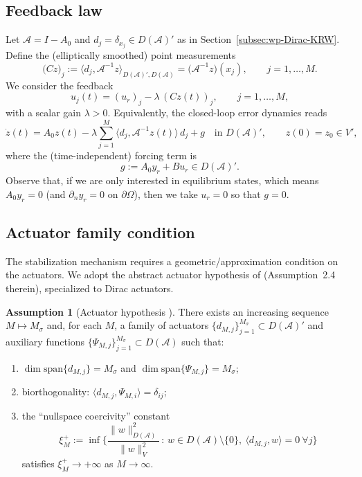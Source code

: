 \documentclass[11pt,a4paper]{article}
\numberwithin{equation}{section}
\theoremstyle{definition}
\newtheorem{assumption}[theorem]{Assumption}
\newcommand{\1}{\mathbbm{1}}
\begin{document}
\subsection{Feedback law}
\noindent
Let $\mathcal A=I-A_0$ and $d_j=\delta_{x_j}\in D(\mathcal A)'$ as in Section~\ref{subsec:wp-Dirac-KRW}.
Define the (elliptically smoothed) point measurements
\[
\big(Cz\big)_j := \langle d_j,\mathcal A^{-1}z\rangle_{D(\mathcal A)',D(\mathcal A)}
= \big(\mathcal A^{-1}z\big)(x_j),\qquad j=1,\dots,M.
\]
We consider the feedback
\begin{equation}
\label{eq:KRW-feedback}
u_j(t) = (u_r)_j -\lambda\, (Cz(t))_j,\qquad j=1,\dots,M,
\end{equation}
with a scalar gain $\lambda>0$. Equivalently, the closed-loop error dynamics reads
\begin{equation}
\label{eq:KRW-closed-loop}
\dot z(t)=A_0 z(t) -\lambda\sum_{j=1}^M \langle d_j,\mathcal A^{-1}z(t)\rangle\, d_j + g
\quad\text{in }D(\mathcal A)',\qquad z(0)=z_0\in V',
\end{equation}
where the (time-independent) forcing term is
\begin{equation}
\label{eq:feedforward-g}
g:=A_0 y_r + B u_r\in D(\mathcal A)'.
\end{equation}
\noindent
Observe that, if we are only interested in equilibrium states, which means $A_0y_r=0$ (and $\partial_n y_r=0$ on $\partial \Omega$), then we take $u_r=0$ so that $g=0$.
\subsection{Actuator family condition}
\noindent
The stabilization mechanism requires a geometric/approximation condition on the actuators.
We adopt the abstract actuator hypothesis of \cite{KunRodWal24-cocv}
(Assumption~2.4 therein), specialized to Dirac actuators.

\begin{assumption}[Actuator hypothesis \cite{KunRodWal24-cocv}]
\label{assump:KRW-act}
There exists an increasing sequence $M\mapsto M_\sigma$ and, for each $M$, a family of
actuators $\{d_{M,j}\}_{j=1}^{M_\sigma}\subset D(\mathcal A)'$ and auxiliary functions
$\{\Psi_{M,j}\}_{j=1}^{M_\sigma}\subset D(\mathcal A)$ such that:
\begin{enumerate}
\item $\dim\mathrm{span}\{d_{M,j}\}=M_\sigma$ and $\dim\mathrm{span}\{\Psi_{M,j}\}=M_\sigma$;
\item biorthogonality: $\langle d_{M,j},\Psi_{M,i}\rangle=\delta_{ij}$;
\item the ``nullspace coercivity'' constant
\[
\xi_M^+ := \inf\Big\{\frac{\|w\|_{D(\mathcal A)}^2}{\|w\|_{V}^2}\,:\,
w\in D(\mathcal A)\setminus\{0\},\ \langle d_{M,j},w\rangle=0\ \forall j\Big\}
\]
satisfies $\xi_M^+\to+\infty$ as $M\to\infty$.
\end{enumerate}
\end{assumption}
\end{document}
